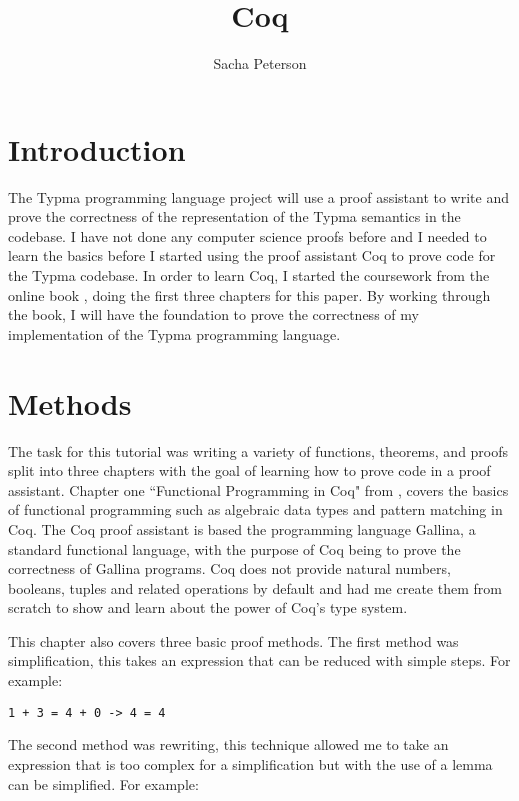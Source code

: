 \documentclass[10pt,twocolumn]{article}
\title{Coq}
\author{Sacha Peterson}
\affiliation{Occidental College}
\begin{document}
\maketitle

\section{Introduction}

The Typma programming language project will use a proof assistant to write and prove the correctness of the representation of the Typma semantics in the codebase. I have not done any computer science proofs before and I needed to learn the basics before I started using the proof assistant Coq to prove code for the Typma codebase. In order to learn Coq, I started the coursework from the online book \textcite{Pierce2021Software}, doing the first three chapters for this paper. By working through the book, I will have the foundation to prove the correctness of my implementation of the Typma programming language.

\section{Methods}

The task for this tutorial was writing a variety of functions, theorems, and proofs split into three chapters with the goal of learning how to prove code in a proof assistant. Chapter one ``Functional Programming in Coq" from \textcite{Pierce2021Software}, covers the basics of functional programming such as algebraic data types and pattern matching in Coq. The Coq proof assistant is based the programming language Gallina, a standard functional language, with the purpose of Coq being to prove the correctness of Gallina programs. Coq does not provide natural numbers, booleans, tuples and related operations by default and \textcite{Pierce2021Software} had me create them from scratch to show and learn about the power of Coq's type system.

This chapter also covers three basic proof methods. The first method was simplification, this takes an expression that can be reduced with simple steps. For example:

\begin{lstlisting}
1 + 3 = 4 + 0 -> 4 = 4
\end{lstlisting}

The second method was rewriting, this technique allowed me to take an expression that is too complex for a simplification but with the use of a lemma can be simplified. For example:
\end{document}
